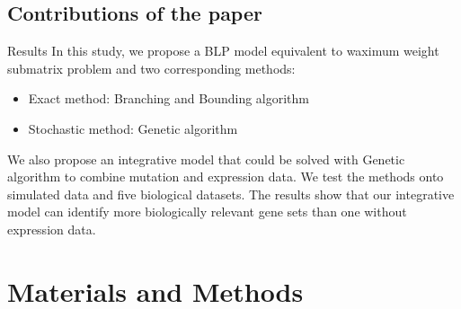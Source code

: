 \documentclass[xcolor=dvipsnames]{beamer}
\begin{document}
\subsection{Contributions of the paper}
\begin{frame}{Results}
In this study, we propose a BLP model equivalent to waximum weight submatrix problem and two corresponding methods:\\
\begin{itemize}
\item Exact method: Branching and Bounding algorithm\\
\item Stochastic method: Genetic algorithm\\
\end{itemize}
We also propose an integrative model that could be solved with Genetic algorithm to combine mutation and expression data. We test the methods onto simulated data and five biological datasets. The results show that our integrative model can identify more biologically relevant gene sets than one without expression data.\\
\end{frame}
\section{Materials and Methods}
\end{document}
